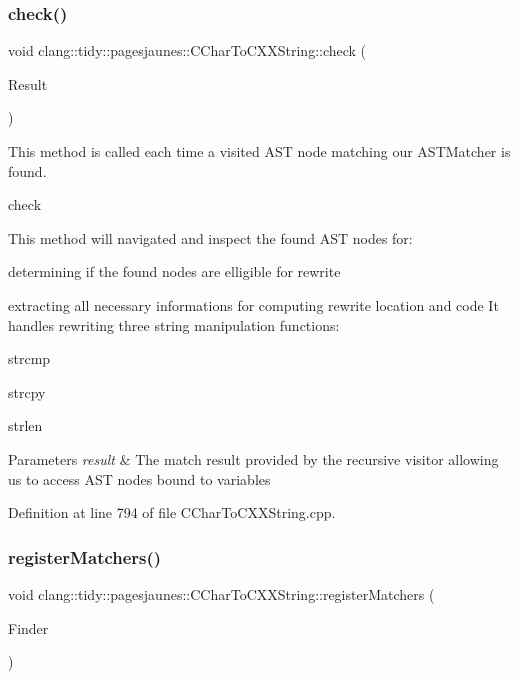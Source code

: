 \subsubsection{\texorpdfstring{check()}{check()}}
{\footnotesize\ttfamily void clang\+::tidy\+::pagesjaunes\+::\+C\+Char\+To\+C\+X\+X\+String\+::check (\begin{DoxyParamCaption}\item[{const ast\+\_\+matchers\+::\+Match\+Finder\+::\+Match\+Result \&}]{Result }\end{DoxyParamCaption})\hspace{0.3cm}{\ttfamily [override]}}



This method is called each time a visited A\+ST node matching our A\+S\+T\+Matcher is found. 

check

This method will navigated and inspect the found A\+ST nodes for\+:
\begin{DoxyItemize}
\item determining if the found nodes are elligible for rewrite
\item extracting all necessary informations for computing rewrite location and code It handles rewriting three string manipulation functions\+:
\item strcmp
\item strcpy
\item strlen
\end{DoxyItemize}


\begin{DoxyParams}{Parameters}
{\em result} & The match result provided by the recursive visitor allowing us to access A\+ST nodes bound to variables \\
\hline
\end{DoxyParams}


Definition at line 794 of file C\+Char\+To\+C\+X\+X\+String.\+cpp.

\mbox{\label{classclang_1_1tidy_1_1pagesjaunes_1_1_c_char_to_c_x_x_string_ab0ef139bc40f42a606a376b6f7d41236}} 
\subsubsection{\texorpdfstring{register\+Matchers()}{registerMatchers()}}
{\footnotesize\ttfamily void clang\+::tidy\+::pagesjaunes\+::\+C\+Char\+To\+C\+X\+X\+String\+::register\+Matchers (\begin{DoxyParamCaption}\item[{ast\+\_\+matchers\+::\+Match\+Finder $\ast$}]{Finder }\end{DoxyParamCaption})\hspace{0.3cm}{\ttfamily [override]}}



